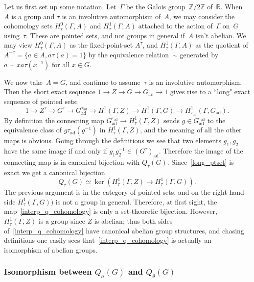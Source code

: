 \documentclass[10pt,leqno]{article}
\newcommand{\ad}{\mathrm{ad}}
\newcommand{\Gad}{G_\mathrm{ad}}
\newcommand{\R}{\mathbb R}
\newcommand{\Z}{\mathbb Z}
\newcommand\inv{^{-1}}
\begin{document}
Let us first set up some notation. Let~$\Gamma$ be the Galois group~$\Z/2\Z$ of~$\R$. When~$A$ is a group and $\tau$ is an involutive automorphism of~$A$, we may consider the cohomology sets $H^0_\tau(\Gamma, A)$ and $H^1_\tau(\Gamma, A)$ attached to the action of~$\Gamma$ on~$G$ using~$\tau$.  These are pointed sets, and not groups in general if~$A$ isn't abelian. We may view $H^0_\tau(\Gamma, A)$ as the fixed-point-set $A^{\tau}$, and $H^1_\tau(\Gamma,A)$ as the quotient of $A^{-\tau} = \{ a \in A, a\tau(a)=1\}$ by the equivalence relation~$\sim$ generated by $a \sim x a \tau(x^{-1})$ for all $x \in G$. 


We now take~$A=G$, and continue to assume~$\tau$ is an involutive automorphism. Then the short exact sequence $1\rightarrow Z \rightarrow G \rightarrow \Gad\rightarrow 1$ 
gives rise to a ``long" exact sequence of pointed sets:
\begin{equation} \label{long_ptset}
1\rightarrow Z^\tau \rightarrow G^\tau \rightarrow \Gad^{\tau_{\ad}} \rightarrow H^1_\tau(\Gamma,Z)\rightarrow H^1_\tau(\Gamma,G)\rightarrow H^1_{\tau_\ad}(\Gamma,\Gad).
\end{equation}
By definition the connecting map  $ \Gad^{\tau_{\ad}} \rightarrow H^1_\tau(\Gamma,Z)$ sends $g \in \Gad^{\tau_{\ad}}$ to the equivalence class of $g \tau_{\ad}(g^{-1})$ in $H^1_\tau(\Gamma, Z)$, and the meaning of all the other maps is obvious. 
Going through the definitions we see that  two elements  $g_1, g_2$ have the same image if and only if $g_1 g_{2}\inv \in (G^\tau)_{\ad}$. 
Therefore the image of the connecting map is in canonical bijection with $Q_\tau(G)$. Since~\eqref{long_ptset} is exact we get a canonical bijection
\begin{equation} \label{interp_q_cohomology} Q_{\tau}(G) \simeq \ker(H^1_\tau(\Gamma,Z)\rightarrow H^1_\tau(\Gamma,G)).\end{equation}
The previous argument is in the category of pointed sets, and on the right-hand side $H^1_\tau(\Gamma,G))$  is not a group in general. Therefore, at first sight, the map~\eqref{interp_q_cohomology} is only a set-theoretic bijection. However, 
$H^1_\tau(\Gamma,Z)$ is a group since $Z$ is abelian; thus both sides of~\eqref{interp_q_cohomology} have canonical abelian group structures, and chasing definitions one easily sees that~\eqref{interp_q_cohomology} is actually an isomorphism of abelian groups.
 

\subsubsection{Isomorphism between $Q_{\sigma}(G)$ and $Q_{\theta}(G)$}
\end{document}
